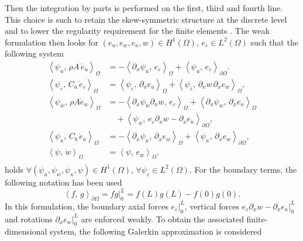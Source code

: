 \documentclass{ifacconf}
\newcommand{\inner}[3][]{\ensuremath{\left\langle #2, \, #3 \right\rangle_{#1}}}
\begin{document}
Then the integration by parts is performed on the first, third and fourth line. This choice is such to retain the skew-symmetric structure at the discrete level and to lower the regularity requirement for the finite elements \cite[Chap. 8]{brugnoli2020thesis}. The weak formulation then looks for $(e_u, e_w, e_\kappa, w) \in H^1(\Omega), \, e_\varepsilon \in L^2(\Omega)$
such that the following system
\begin{equation}\label{eq:weak_form}
	\begin{aligned}
		\inner[\Omega]{\psi_u}{\rho A \, \dot{e}_u} &= -\inner[\Omega]{\partial_x \psi_u}{ e_\varepsilon} +  \inner[\partial\Omega]{\psi_u}{e_\varepsilon}. \\
		\inner[\Omega]{\psi_\varepsilon}{C_a \, \dot{e}_\varepsilon} &= \inner[\Omega]{\psi_\varepsilon}{\partial_x e_u} + \inner[\Omega]{\psi_\varepsilon}{\partial_x w \, \partial_x e_w}, \\
		\inner[\Omega]{\psi_w}{\rho A\dot{e}_w} &= -\inner[\Omega]{\partial_x \psi_w \partial_x w}{e_\varepsilon} + \inner[\Omega]{\partial_{x} \psi_w}{\partial_{x} e_\kappa} \\
		&\quad +\inner[\partial\Omega]{\psi_w}{e_\varepsilon \partial_x w - \partial_x e_\kappa}, \\
		\inner[\Omega]{\psi_\kappa}{C_b \, \dot{e}_\kappa} &= - \inner[\Omega]{\partial_{x} \psi_\kappa}{\partial_{x} e_w} + \inner[\partial\Omega]{\psi_\kappa}{\partial_x e_w}, \\
		\inner[\Omega]{\psi}{\dot{w}} &= \inner[\Omega]{\psi}{e_w}. \\
	\end{aligned}
\end{equation}
holds $\forall (\psi_u, \psi_w, \psi_\kappa, \psi) \in H^1(\Omega), \, \forall \psi_\varepsilon \in L^2(\Omega)$. For the boundary terms, the following notation has been used
\begin{equation*}
	\inner[\partial\Omega]{f}{g} = f g \vert_{0}^L = f(L)g(L) - f(0)g(0).
\end{equation*} 
In this formulation, the boundary axial forces $e_\varepsilon\vert_{0}^L$, vertical forces $e_\varepsilon\partial_x w - \partial_x e_\kappa\vert_{0}^L$ and  rotations $\partial_x e_w\vert_{0}^L$ are enforced weakly. To obtain the associated finite-dimensional system, the following Galerkin approximation is considered 
\end{document}
